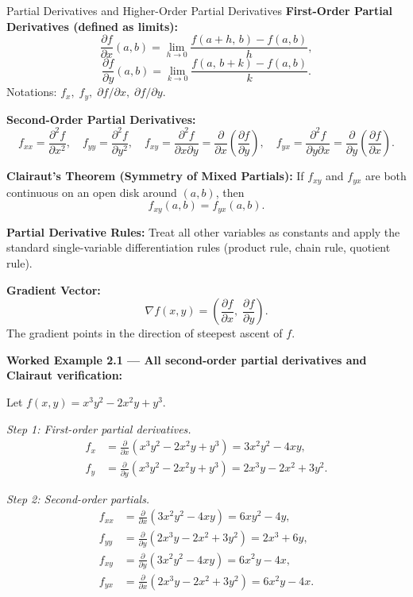 \documentclass[12pt,a4paper]{article}
\begin{document}
\begin{infobox}{Partial Derivatives and Higher-Order Partial Derivatives}
\textbf{First-Order Partial Derivatives (defined as limits):}
\[
\frac{\partial f}{\partial x}(a,b) = \lim_{h \to 0} \frac{f(a+h,\, b) - f(a,b)}{h},
\]
\[
\frac{\partial f}{\partial y}(a,b) = \lim_{k \to 0} \frac{f(a,\, b+k) - f(a,b)}{k}.
\]
Notations: \(f_x,\; f_y,\; \partial f/\partial x,\; \partial f/\partial y\).

\textbf{Second-Order Partial Derivatives:}
\[
f_{xx} = \frac{\partial^2 f}{\partial x^2}, \quad
f_{yy} = \frac{\partial^2 f}{\partial y^2}, \quad
f_{xy} = \frac{\partial^2 f}{\partial x \partial y} = \frac{\partial}{\partial x}\!\left(\frac{\partial f}{\partial y}\right), \quad
f_{yx} = \frac{\partial^2 f}{\partial y \partial x} = \frac{\partial}{\partial y}\!\left(\frac{\partial f}{\partial x}\right).
\]

\textbf{Clairaut's Theorem (Symmetry of Mixed Partials):} If \(f_{xy}\) and \(f_{yx}\) are both continuous on an open disk around \((a,b)\), then
\[
f_{xy}(a,b) = f_{yx}(a,b).
\]

\textbf{Partial Derivative Rules:} Treat all other variables as constants and apply the standard single-variable differentiation rules (product rule, chain rule, quotient rule).

\textbf{Gradient Vector:}
\[
\nabla f(x,y) = \left(\frac{\partial f}{\partial x},\; \frac{\partial f}{\partial y}\right).
\]
The gradient points in the direction of steepest ascent of \(f\).
\end{infobox}

\textbf{Worked Example 2.1 --- All second-order partial derivatives and Clairaut verification:}

Let \(f(x,y) = x^3 y^2 - 2x^2 y + y^3\).

\textit{Step 1: First-order partial derivatives.}
\begin{align*}
f_x &= \frac{\partial}{\partial x}(x^3 y^2 - 2x^2 y + y^3) = 3x^2 y^2 - 4xy, \\
f_y &= \frac{\partial}{\partial y}(x^3 y^2 - 2x^2 y + y^3) = 2x^3 y - 2x^2 + 3y^2.
\end{align*}

\textit{Step 2: Second-order partials.}
\begin{align*}
f_{xx} &= \frac{\partial}{\partial x}(3x^2 y^2 - 4xy) = 6xy^2 - 4y, \\
f_{yy} &= \frac{\partial}{\partial y}(2x^3 y - 2x^2 + 3y^2) = 2x^3 + 6y, \\
f_{xy} &= \frac{\partial}{\partial y}(3x^2 y^2 - 4xy) = 6x^2 y - 4x, \\
f_{yx} &= \frac{\partial}{\partial x}(2x^3 y - 2x^2 + 3y^2) = 6x^2 y - 4x.
\end{align*}
\end{document}
